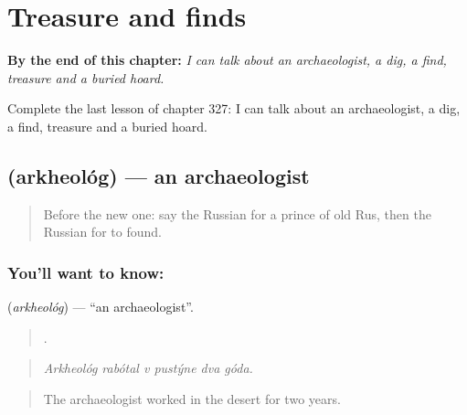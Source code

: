 
\chapter{Treasure and finds}
\label{ch:ru-treasure-and-finds}

\begin{chapteropening}
\textbf{By the end of this chapter:} \emph{I can talk about an archaeologist, a dig, a find, treasure and a buried hoard.}

Complete the last lesson of chapter 327: I can talk about an archaeologist, a dig, a find, treasure and a buried hoard.
\end{chapteropening}

\section[\texorpdfstring{\ru{археолог} (arkheológ)}{археолог (arkheológ)}]{ (arkheológ) — an archaeologist}

\label{lesson:RU-C327-arkheolog}



\begin{quote}
Before the new one: say the Russian for a prince of old Rus, then the Russian for to found.
\end{quote}

\subsection*{You'll want to know: }
\textbf{} (\emph{arkheológ}) — \textquotedblleft{}an archaeologist\textquotedblright{}.

\begin{quote}
     .
\end{quote}

\begin{quote}
\emph{Arkheológ rabótal v pustýne dva góda.}
\end{quote}

\begin{quote}
The archaeologist worked in the desert for two years.
\end{quote}

